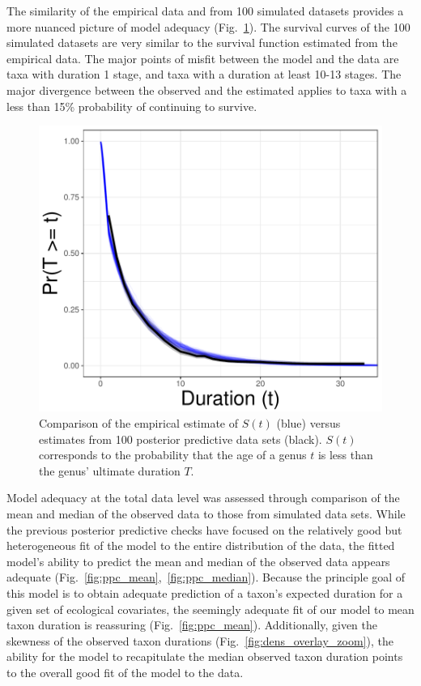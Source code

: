 \documentclass[11pt]{article}
\begin{document}
The similarity of the empirical data and from 100 simulated datasets provides a more nuanced picture of model adequacy (Fig.~\ref{fig:surv}). The survival curves of the 100 simulated datasets are very similar to the survival function estimated from the empirical data. The major points of misfit between the model and the data are taxa with duration 1 stage, and taxa with a duration at least 10-13 stages. The major divergence between the observed and the estimated applies to taxa with a less than 15\% probability of continuing to survive. 

\begin{figure}[ht]
  \centering
  \includegraphics[height = 0.5\textheight,width=\textwidth,keepaspectratio=true]{figure/survival_curves_cweib_cens}
  \caption{Comparison of the empirical estimate of \(S(t)\) (blue) versus estimates from 100 posterior predictive data sets (black). \(S(t)\) corresponds to the probability that the age of a genus \(t\) is less than the genus' ultimate duration \(T\). }
  \label{fig:surv}
\end{figure}


Model adequacy at the total data level was assessed through comparison of the mean and median of the observed data to those from simulated data sets. While the previous posterior predictive checks have focused on the relatively good but heterogeneous fit of the model to the entire distribution of the data, the fitted model's ability to predict the mean and median of the observed data appears adequate (Fig.~\ref{fig:ppc_mean},~\ref{fig:ppc_median}). Because the principle goal of this model is to obtain adequate prediction of a taxon's expected duration for a given set of ecological covariates, the seemingly adequate fit of our model to mean taxon duration is reassuring (Fig.~\ref{fig:ppc_mean}). Additionally, given the skewness of the observed taxon durations (Fig.~\ref{fig:dens_overlay_zoom}), the ability for the model to recapitulate the median observed taxon duration points to the overall good fit of the model to the data.
\end{document}
